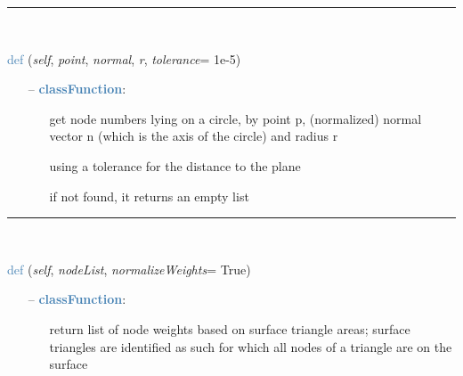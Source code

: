 \begin{itemize}[leftmargin=1.4cm]
\begin{itemize}[leftmargin=1.4cm]
\begin{itemize}[leftmargin=0.5cm]
\begin{itemize}[leftmargin=1.4cm]
\begin{itemize}[leftmargin=1.4cm]
\begin{itemize}[leftmargin=0.5cm]
\begin{itemize}[leftmargin=0.7cm]
\vspace{12pt}\end{itemize}
%
\noindent\rule{8cm}{0.75pt}\vspace{1pt} \\ 
\begin{flushleft}
\noindent \textcolor{steelblue}{def {\bf {}}}\label{sec:FEM:FEMinterface:GetNodesOnCircle}
({\it self}, {\it point}, {\it normal}, {\it r}, {\it tolerance}= 1e-5)
\end{flushleft}
\setlength{\itemindent}{0.7cm}
\begin{itemize}[leftmargin=0.7cm]
  \item[--]  \textcolor{steelblue}{\bf classFunction}: \vspace{-6pt}
  \begin{itemize}[leftmargin=1.2cm]
\setlength{\itemindent}{-0.7cm}
    \item[] get node numbers lying on a circle, by point p, (normalized) normal vector n (which is the axis of the circle) and radius r
    \item[] using a tolerance for the distance to the plane
    \item[] if not found, it returns an empty list
  \end{itemize}
\vspace{12pt}\end{itemize}
%
\noindent\rule{8cm}{0.75pt}\vspace{1pt} \\ 
\begin{flushleft}
\noindent \textcolor{steelblue}{def {\bf {}}}\label{sec:FEM:FEMinterface:GetNodeWeightsFromSurfaceAreas}
({\it self}, {\it nodeList}, {\it normalizeWeights}= True)
\end{flushleft}
\setlength{\itemindent}{0.7cm}
\begin{itemize}[leftmargin=0.7cm]
  \item[--]  \textcolor{steelblue}{\bf classFunction}: \vspace{-6pt}
  \begin{itemize}[leftmargin=1.2cm]
\setlength{\itemindent}{-0.7cm}
    \item[] return list of node weights based on surface triangle areas; surface triangles are identified as such for which all nodes of a triangle are on the surface

\end{itemize}
\end{itemize}
\end{itemize}
\end{itemize}
\end{itemize}
\end{itemize}
\end{itemize}
\end{itemize}
